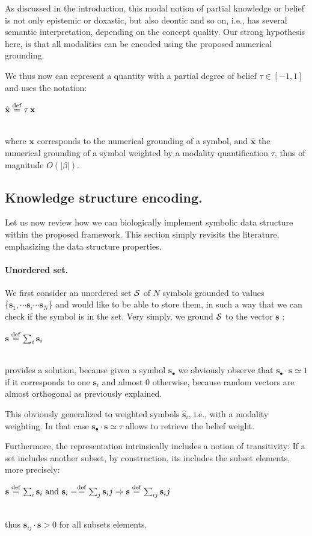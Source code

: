 \documentclass[a4]{article}
\newcommand{\deq}{\stackrel {\rm def}{=}}
\newcommand{\eqline}[1]{~\vspace{0.1cm}\\\centerline{$#1$}\vspace{0.1cm}\\}
\begin{document}
As discussed in the introduction, this modal notion of partial knowledge or belief is not only epistemic or doxastic, but also deontic and so on, i.e., has several semantic interpretation, depending on the concept quality. Our strong hypothesis here, is that all modalities can be encoded using the proposed numerical grounding.

We thus now can represent a quantity with a partial degree of belief $\tau \in [-1, 1]$ and uses the notation:
\eqline{\hat{\mathbf{x}} \deq \tau \, \mathbf{x}}
where $\mathbf{x}$ corresponds to the numerical grounding of a symbol, and $\hat{\mathbf{x}}$ the numerical grounding of a symbol weighted by a modality quantification $\tau$, thus of magnitude $O(|\beta|)$.

\subsection{Knowledge structure encoding.}

Let us now review how we can biologically implement symbolic data structure within the proposed framework. This section simply revisits the literature, emphasizing the data structure properties.

\paragraph{Unordered set.} We first consider an unordered set ${\cal S}$ of $N$ symbols grounded to values $\{\mathbf{s}_1, \cdots \mathbf{s}_i \cdots \mathbf{s}_N\}$ and would like to be able to store them, in such a way that we can check if the symbol is in the set. Very simply, we ground ${\cal S}$ to the vector $\mathbf{s}$ :
\eqline{\mathbf{s} \deq \sum_i \mathbf{s}_i}
provides a solution, because given a symbol $\mathbf{s}_\bullet$ we obviously observe that $\mathbf{s}_\bullet \cdot \mathbf{s} \simeq 1$ if it corresponds to one $\mathbf{s}_i$ and almost $0$ otherwise, because random vectors are almost orthogonal as previously explained.

This obviously generalized to weighted symbols $\hat{\mathbf{s}}_i$, i.e., with a modality weighting. In that case $\mathbf{s}_\bullet \cdot \mathbf{s} \simeq \tau$ allows to retrieve the belief weight.

Furthermore, the representation intrinsically includes a notion of transitivity: If a set includes another subset, by construction, its includes the subset elements, more precisely:
\eqline{\mathbf{s} \deq \sum_i \mathbf{s}_i \mbox{ and } \mathbf{s}_i = \deq \sum_j \mathbf{s}_ij \Rightarrow \mathbf{s} \deq \sum_{ij} \mathbf{s}_ij}
thus $\mathbf{s}_{ij} \cdot \mathbf{s} > 0$ for all subsets elements.
\end{document}
